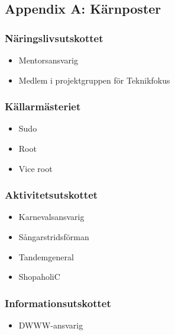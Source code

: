 \documentclass{dsekprotokoll}
\begin{document}
\subsection*{Appendix A: Kärnposter}
\begin{multicols}{2}

    \subsubsection*{Näringslivsutskottet}
    \begin{itemize}
        \item Mentorsansvarig
        \item Medlem i projektgruppen för Teknikfokus
    \end{itemize}

    \subsubsection*{Källarmästeriet}
    \begin{itemize}
        \item Sudo
        \item Root
        \item Vice root
    \end{itemize}

    \subsubsection*{Aktivitetsutskottet}
    \begin{itemize}
        \item Karnevalsansvarig
        \item Sångarstridsförman
        \item Tandemgeneral
        \item ShopaholiC
    \end{itemize}

    \subsubsection*{Informationsutskottet}
    \begin{itemize}
        \item DWWW-ansvarig
    \end{itemize}


\end{multicols}
\end{document}
